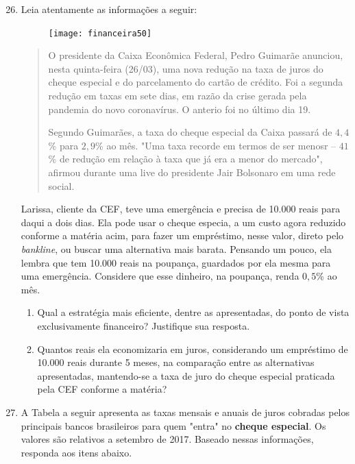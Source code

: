 \begin{enumerate}\setcounter{enumi}{25}
\item Leia atentamente as informações a seguir:

\begin{figure}[H]
\centering

\texttt{[image: financeira50]}
\end{figure}

\begin{quote}
O presidente da Caixa Econômica Federal, Pedro Guimarãe anunciou, nesta quinta-feira (26/03), uma nova redução na taxa de juros do cheque especial e do parcelamento do cartão de crédito. Foi a segunda redução em taxas em sete dias, em razão da crise gerada pela pandemia do novo coronavírus. O anterio foi no último dia 19.

Segundo Guimarães, a taxa do cheque especial da Caixa passará de $4{,}4$\% para $2{,}9$\% ao mês. "Uma taxa recorde em termos de ser menosr -- $41$\% de redução em relação à taxa que já era a menor do mercado", afirmou durante uma live do presidente Jair Bolsonaro em uma rede social.
\end{quote}

Larissa, cliente da CEF, teve uma emergência e precisa de 10.000 reais para daqui a dois dias. Ela pode usar o cheque especia, a um custo agora reduzido conforme a matéria acim, para fazer um empréstimo, nesse valor, direto pelo \textit{bankline}, ou buscar uma alternativa mais barata. Pensando um pouco, ela lembra que tem 10.000 reais na poupança, guardados por ela mesma para uma emergência. Considere que esse dinheiro, na poupança, renda $0{,}5$\% ao mês.
  \begin{enumerate}
    \item Qual a estratégia mais eficiente, dentre as apresentadas, do ponto de vista exclusivamente financeiro? Justifique sua resposta.
    \item Quantos reais ela economizaria em juros, considerando um empréstimo de 10.000 reais durante 5 meses, na comparação entre as alternativas apresentadas, mantendo-se a taxa de juro do cheque especial praticada pela CEF conforme a matéria?
  \end{enumerate}

\item A Tabela a seguir apresenta as taxas mensais e anuais de juros cobradas pelos principais bancos brasileiros para quem "entra"{} no \textbf{cheque especial}. Os valores são relativos a setembro de 2017. Baseado nessas informações, responda aos itens abaixo.


\end{enumerate}
